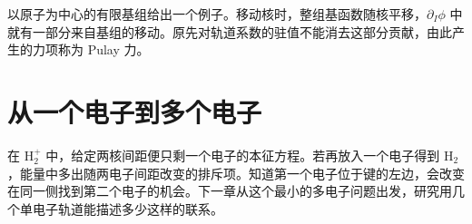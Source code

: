 以原子为中心的有限基组给出一个例子。移动核时，整组基函数随核平移，$\partial_I\phi$ 中就有一部分来自基组的移动。原先对轨道系数的驻值不能消去这部分贡献，由此产生的力项称为 Pulay 力。

\section{从一个电子到多个电子}\label{bo:to-hartree}
在 $\mathrm H_2^+$ 中，给定两核间距便只剩一个电子的本征方程。若再放入一个电子得到 $\mathrm H_2$，能量中多出随两电子间距改变的排斥项。知道第一个电子位于键的左边，会改变在同一侧找到第二个电子的机会。下一章从这个最小的多电子问题出发，研究用几个单电子轨道能描述多少这样的联系。
